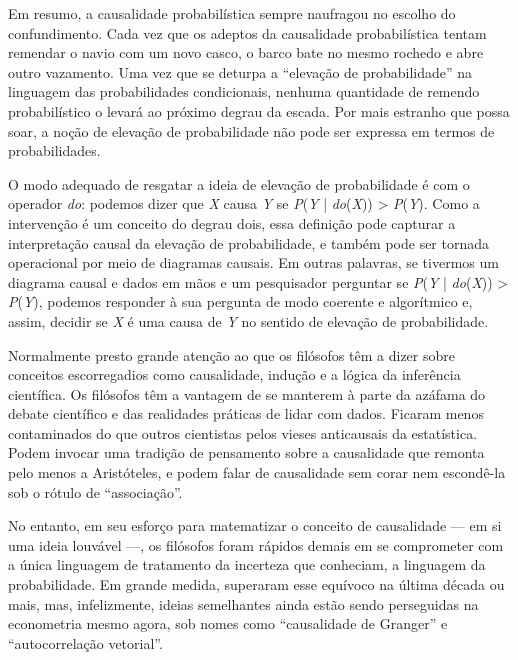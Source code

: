\documentclass[11pt,a5paper,twoside]{book}
\begin{document}
Em resumo, a causalidade probabilística sempre naufragou no escolho do confundimento. Cada vez que os adeptos da causalidade probabilística tentam remendar o navio com um novo casco, o barco bate no mesmo rochedo e abre outro vazamento. Uma vez que se deturpa a “elevação de probabilidade” na linguagem das probabilidades condicionais, nenhuma quantidade de remendo probabilístico o levará ao próximo degrau da escada. Por mais estranho que possa soar, a noção de elevação de probabilidade não pode ser expressa em termos de probabilidades.

O modo adequado de resgatar a ideia de elevação de probabilidade é com o operador \textit{do}: podemos dizer que \textit{X} causa \textit{Y} se \textit{P}(\textit{Y} | \textit{do}(\textit{X})) > \textit{P}(\textit{Y}). Como a intervenção é um conceito do degrau dois, essa definição pode capturar a interpretação causal da elevação de probabilidade, e também pode ser tornada operacional por meio de diagramas causais. Em outras palavras, se tivermos um diagrama causal e dados em mãos e um pesquisador perguntar se \textit{P}(\textit{Y} | \textit{do}(\textit{X})) > \textit{P}(\textit{Y}), podemos responder à sua pergunta de modo coerente e algorítmico e, assim, decidir se \textit{X} é uma causa de \textit{Y} no sentido de elevação de probabilidade.

Normalmente presto grande atenção ao que os filósofos têm a dizer sobre conceitos escorregadios como causalidade, indução e a lógica da inferência científica. Os filósofos têm a vantagem de se manterem à parte da azáfama do debate científico e das realidades práticas de lidar com dados. Ficaram menos contaminados do que outros cientistas pelos vieses anticausais da estatística. Podem invocar uma tradição de pensamento sobre a causalidade que remonta pelo menos a Aristóteles, e podem falar de causalidade sem corar nem escondê-la sob o rótulo de “associação”.

No entanto, em seu esforço para matematizar o conceito de causalidade — em si uma ideia louvável —, os filósofos foram rápidos demais em se comprometer com a única linguagem de tratamento da incerteza que conheciam, a linguagem da probabilidade. Em grande medida, superaram esse equívoco na última década ou mais, mas, infelizmente, ideias semelhantes ainda estão sendo perseguidas na econometria mesmo agora, sob nomes como “causalidade de Granger” e “autocorrelação vetorial”.
\end{document}
